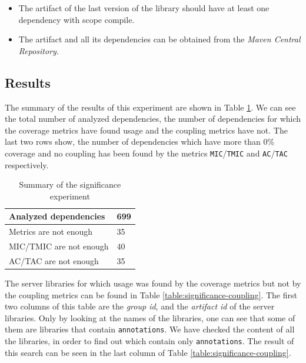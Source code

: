 \begin{itemize}
  \item The artifact of the last version of the library should have at least one dependency with scope compile.
  \item The artifact and all its dependencies can be obtained from the \textit{Maven Central Repository}.
\end{itemize}


\subsection{Results}

The summary of the results of this experiment are shown in Table \ref{table:summary-significance}. We can see the total number of analyzed dependencies, the number of dependencies for which the coverage metrics have found usage and the coupling metrics have not. The last two rows show, the number of dependencies which have more than 0\% coverage and no coupling has been found by the metrics \texttt{MIC}/\texttt{TMIC} and \texttt{AC}/\texttt{TAC} respectively.

\begin{table}[ht]
\begin{center}
\begin{tabular}{l|l}
  \hline
  Analyzed dependencies   & 699 \\\hline
  Metrics are not enough  & 35  \\\hline
  MIC/TMIC are not enough & 40  \\\hline
  AC/TAC are not enough   & 35  \\\hline
\end{tabular}
\end{center}
\caption{Summary of the significance experiment}
\label{table:summary-significance}
\end{table}

The server libraries for which usage was found by the coverage metrics but not by the coupling metrics can be found in Table \ref{table:significance-coupling}. The first two columns of this table are the \textit{group id}, and the \textit{artifact id} of the server libraries. Only by looking at the names of the libraries, one can see that some of them are libraries that contain \texttt{annotations}. We have checked the content of all the libraries, in order to find out which contain only \texttt{annotations}. The result of this search can be seen in the last column of Table \ref{table:significance-coupling}.

